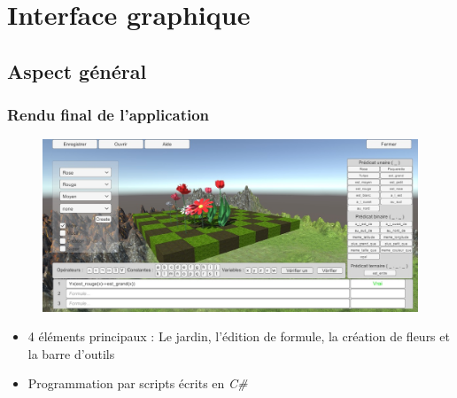 \documentclass{beamer}
\begin{document}
\section{Interface graphique}
\subsection{Aspect général}
\begin{frame}
\frametitle{Rendu final de l'application}
\begin{center}
\begin{figure}[!h]
\includegraphics[scale=0.35]{renduFinal.jpg}
\end{figure}
\end{center}
\begin{itemize}
\item 4 éléments principaux : Le jardin, l'édition de formule, la création de fleurs et la barre d'outils
\item Programmation par scripts écrits en \textit{C\#}
\end{itemize}
\end{frame}

\end{document}
